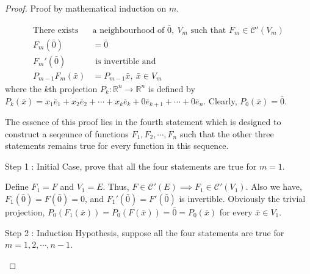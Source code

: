 \begin{proof}
Proof by mathematical induction on $m$.
\begin{commentary}
\begin{align}
	\text{There exists } & \text{a neighbourhood of } \bar{0},\ V_m  \text{ such that } F_m \in \mathscr{C}'(V_m)\\
	F_m(\bar{0}) & = \bar{0}\\
	F_m'(\bar{0}) & \text{ is invertible and }\\
	P_{m-1}F_m(\bar{x}) & = P_{m-1}\bar{x},\ \bar{x} \in V_m
\end{align}
	where the $k$th projection $P_k : \mathbb{R}^n \to \mathbb{R}^n$ is defined by $P_k(\bar{x}) = x_1\bar{e}_1 + x_2\bar{e}_2 + \cdots + x_k\bar{e}_k + 0\bar{e}_{k+1} + \cdots + 0\bar{e}_n$.
Clearly, $P_0(\bar{x}) = \bar{0}$.

	The essence of this proof lies in the fourth statement which is designed to construct a seqeunce of functions $F_1,F_2,\cdots,F_n$ such that the other three statements remains true for every function in this sequence.\\
\end{commentary}

\begin{commentary}Step 1 : Initial Case, prove that all the four statements are true for $m = 1$.\end{commentary}

Define $F_1 = F$ and $V_1 = E$.
Thus, $F \in \mathscr{C}'(E) \implies F_1 \in \mathscr{C}'(V_1)$.
Also we have, $F_1(\bar{0}) = F(\bar{0}) = 0$, and $F_1'(\bar{0}) = F'(\bar{0})$ is invertible.
Obviously the trivial projection, $P_0(F_1(\bar{x})) = P_0(F(\bar{x})) = \bar{0} = P_0(\bar{x})$ for every $\bar{x} \in V_1$.\\
\begin{commentary}Step 2 : Induction Hypothesis, suppose all the four statements are true for $m = 1,2,\cdots,n-1$.\end{commentary}


\end{proof}
